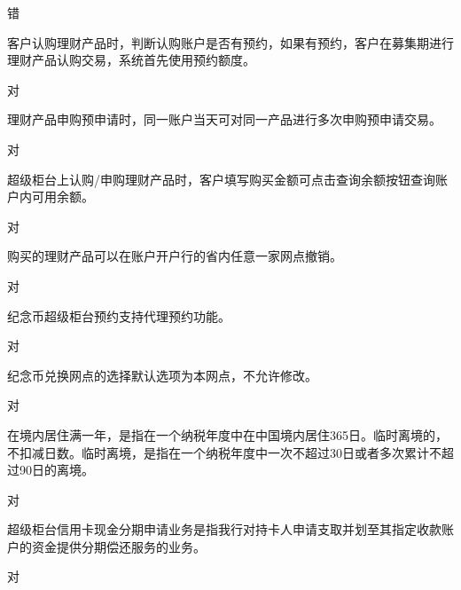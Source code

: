 \documentclass[kindlepaper]{BHCexam4kindle}
\begin{document}
\begin{questions}
\begin{solution} 错 \end{solution}
\qs 客户认购理财产品时，判断认购账户是否有预约，如果有预约，客户在募集期进行理财产品认购交易，系统首先使用预约额度。 \xx
\begin{solution} 对 \end{solution}
\qs 理财产品申购预申请时，同一账户当天可对同一产品进行多次申购预申请交易。 \xx
\begin{solution} 对 \end{solution}
\qs 超级柜台上认购/申购理财产品时，客户填写购买金额可点击查询余额按钮查询账户内可用余额。 \xx
\begin{solution} 对 \end{solution}
\qs 购买的理财产品可以在账户开户行的省内任意一家网点撤销。 \xx
\begin{solution} 对 \end{solution}
\qs 纪念币超级柜台预约支持代理预约功能。 \xx
\begin{solution} 对 \end{solution}
\qs 纪念币兑换网点的选择默认选项为本网点，不允许修改。 \xx
\begin{solution} 对 \end{solution}
\qs 在境内居住满一年，是指在一个纳税年度中在中国境内居住365日。临时离境的，不扣减日数。临时离境，是指在一个纳税年度中一次不超过30日或者多次累计不超过90日的离境。 \xx
\begin{solution} 对 \end{solution}
\qs 超级柜台信用卡现金分期申请业务是指我行对持卡人申请支取并划至其指定收款账户的资金提供分期偿还服务的业务。 \xx
\begin{solution} 对 \end{solution}

\end{questions}
\end{document}
